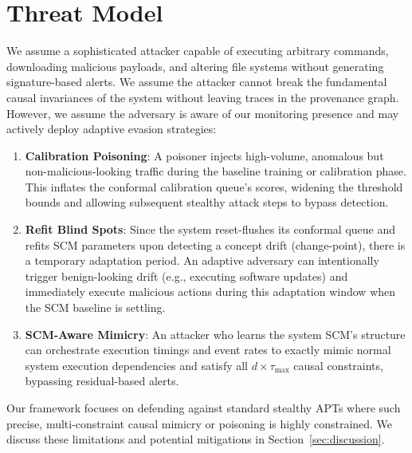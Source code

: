 \section{Threat Model}
\label{sec:threat}
We assume a sophisticated attacker capable of executing arbitrary commands, downloading malicious payloads, and altering file systems without generating signature-based alerts. We assume the attacker cannot break the fundamental causal invariances of the system without leaving traces in the provenance graph. However, we assume the adversary is aware of our monitoring presence and may actively deploy adaptive evasion strategies:

\begin{enumerate}
\item \textbf{Calibration Poisoning}: A poisoner injects high-volume, anomalous but non-malicious-looking traffic during the baseline training or calibration phase. This inflates the conformal calibration queue's scores, widening the threshold bounds and allowing subsequent stealthy attack steps to bypass detection.
\item \textbf{Refit Blind Spots}: Since the system reset-flushes its conformal queue and refits SCM parameters upon detecting a concept drift (change-point), there is a temporary adaptation period. An adaptive adversary can intentionally trigger benign-looking drift (e.g., executing software updates) and immediately execute malicious actions during this adaptation window when the SCM baseline is settling.
\item \textbf{SCM-Aware Mimicry}: An attacker who learns the system SCM's structure can orchestrate execution timings and event rates to exactly mimic normal system execution dependencies and satisfy all $d \times \tau_{\max}$ causal constraints, bypassing residual-based alerts.
\end{enumerate}
Our framework focuses on defending against standard stealthy APTs where such precise, multi-constraint causal mimicry or poisoning is highly constrained. We discuss these limitations and potential mitigations in Section~\ref{sec:discussion}.
